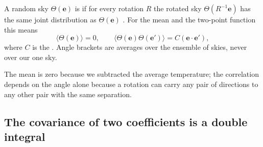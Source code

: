 \begin{workdef}
A random sky $\Theta(\bm e)$ is  if for every rotation $R$ the
rotated sky $\Theta(R^{-1}\bm e)$ has the same joint distribution as $\Theta(\bm e)$
.
For the mean and the two-point function this means
\begin{equation}
  \langle\Theta(\bm e)\rangle=0,\qquad
  \langle\Theta(\bm e)\Theta(\bm e')\rangle=C(\bm e\cdot\bm e'),
  \label{7b:eq:iso-2pt}
\end{equation}
where $C$ is the   . Angle brackets are averages over
the ensemble of skies, never over our one sky.
\end{workdef}

The mean is zero because we subtracted the average temperature; the correlation depends on the
angle alone because a rotation can carry any pair of directions to any other pair with the same
separation.

\subsection{The covariance of two coefficients is a double integral}
\label{7b:sec:cov-integral}

